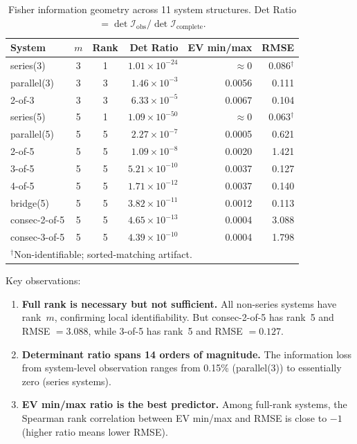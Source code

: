 \documentclass[12pt]{article}
\theoremstyle{definition}
\theoremstyle{remark}
\begin{document}
\begin{table}[htbp]
  \centering
  \caption{Fisher information geometry across 11 system structures.
    Det Ratio $= \det \mathcal{I}_{\mathrm{obs}} /
    \det \mathcal{I}_{\mathrm{complete}}$.}
  \label{tab:fisher_rank}
  \begin{tabular}{lccrrr}
    \toprule
    System & $m$ & Rank & Det Ratio & EV min/max & RMSE \\
    \midrule
    series(3)       & 3 & 1 & $1.01 \times 10^{-24}$ & $\approx 0$ & 0.086$^\dagger$ \\
    parallel(3)     & 3 & 3 & $1.46 \times 10^{-3}$  & 0.0056 & 0.111 \\
    2-of-3          & 3 & 3 & $6.33 \times 10^{-5}$  & 0.0067 & 0.104 \\
    \midrule
    series(5)       & 5 & 1 & $1.09 \times 10^{-50}$ & $\approx 0$ & 0.063$^\dagger$ \\
    parallel(5)     & 5 & 5 & $2.27 \times 10^{-7}$  & 0.0005 & 0.621 \\
    2-of-5          & 5 & 5 & $1.09 \times 10^{-8}$  & 0.0020 & 1.421 \\
    3-of-5          & 5 & 5 & $5.21 \times 10^{-10}$ & 0.0037 & 0.127 \\
    4-of-5          & 5 & 5 & $1.71 \times 10^{-12}$ & 0.0037 & 0.140 \\
    bridge(5)       & 5 & 5 & $3.82 \times 10^{-11}$ & 0.0012 & 0.113 \\
    consec-2-of-5   & 5 & 5 & $4.65 \times 10^{-13}$ & 0.0004 & 3.088 \\
    consec-3-of-5   & 5 & 5 & $4.39 \times 10^{-10}$ & 0.0004 & 1.798 \\
    \bottomrule
    \multicolumn{6}{l}{\footnotesize $^\dagger$Non-identifiable;
      sorted-matching artifact.}
  \end{tabular}
\end{table}

Key observations:
\begin{enumerate}
  \item \textbf{Full rank is necessary but not sufficient.}
    All non-series systems have rank~$m$, confirming local
    identifiability.  But consec-2-of-5 has rank~5 and RMSE $= 3.088$,
    while 3-of-5 has rank~5 and RMSE $= 0.127$.

  \item \textbf{Determinant ratio spans 14 orders of magnitude.}
    The information loss from system-level observation ranges from
    0.15\% (parallel(3)) to essentially zero (series systems).

  \item \textbf{EV min/max ratio is the best predictor.}
    Among full-rank systems, the Spearman rank correlation between
    EV min/max and RMSE is close to $-1$ (higher ratio means lower
    RMSE).
\end{enumerate}
\end{document}
